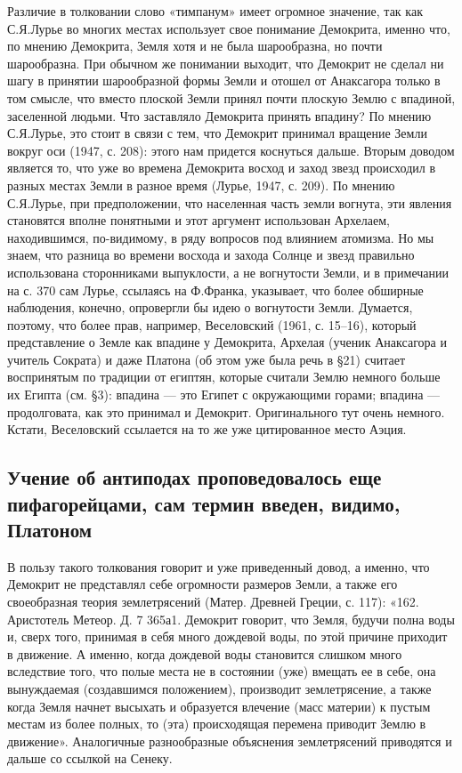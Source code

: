 Различие в  толковании слово  «тимпанум» имеет огромное  значение, так
как С.Я.Лурье  во многих  местах использует свое  понимание Демокрита,
именно что, по мнению Демокрита, Земля  хотя и не была шарообразна, но
почти шарообразна. При  обычном же понимании выходит,  что Демокрит не
сделал  ни  шагу в  принятии  шарообразной  формы  Земли и  отошел  от
Анаксагора только в том смысле,  что вместо плоской Земли принял почти
плоскую Землю с впадиной,  заселенной людьми. Что заставляло Демокрита
принять впадину?  По мнению С.Я.Лурье,  это стоит  в связи с  тем, что
Демокрит принимал вращение Земли вокруг  оси (1947, с. 208): этого нам
придется  коснуться дальше.  Вторым доводом  является то,  что уже  во
времена  Демокрита восход  и заход  звезд происходил  в разных  местах
Земли  в разное  время (Лурье,  1947,  с. 209).  По мнению  С.Я.Лурье,
при  предположении, что  населенная часть  земли вогнута,  эти явления
становятся  вполне понятными  и  этот  аргумент использован  Архелаем,
находившимся,  по-видимому, в  ряду  вопросов  под влиянием  атомизма.
Но  мы  знаем, что  разница  во  времени  восхода  и захода  Солнце  и
звезд правильно использована сторонниками  выпуклости, а не вогнутости
Земли,  и в  примечании на  с. 370  сам Лурье,  ссылаясь на  Ф.Франка,
указывает, что более обширные  наблюдения, конечно, опровергли бы идею
о  вогнутости  Земли. Думается,  поэтому,  что  более прав,  например,
Веселовский  (1961,  с. 15--16),  который  представление  о Земле  как
впадине у Демокрита,  Архелая (ученик Анаксагора и  учитель Сократа) и
даже Платона  (об этом  уже была  речь в  §21) считает  воспринятым по
традиции от  египтян, которые считали  Землю немного больше  их Египта
(см. §3):  впадина ---  это Египет с  окружающими горами;  впадина ---
продолговата,  как это  принимал и  Демокрит. Оригинального  тут очень
немного. Кстати, Веселовский ссылается на то же уже цитированное место
Аэция.

\subsection{Учение об антиподах проповедовалось еще пифагорейцами, сам
термин введен, видимо, Платоном}

В пользу такого толкования говорит  и уже приведенный довод, а именно,
что Демокрит  не представлял себе  огромности размеров Земли,  а также
его своеобразная теория землетрясений (Матер. Древней Греции, с. 117):
«162.  Аристотель Метеор.  Д. 7  365а1. Демокрит  говорит, что  Земля,
будучи полна воды и, сверх того,  принимая в себя много дождевой воды,
по этой  причине приходит  в движение. А  именно, когда  дождевой воды
становится  слишком  много  вследствие  того, что  полые  места  не  в
состоянии  (уже)  вмещать  ее  в себе,  она  вынуждаемая  (создавшимся
положением),  производит землетрясение,  а  также  когда Земля  начнет
высыхать и образуется влечение (масс материи) к пустым местам из более
полных,  то (эта)  происходящая перемена  приводит Землю  в движение».
Аналогичные разнообразные объяснения землетрясений приводятся и дальше
со ссылкой на Сенеку.

